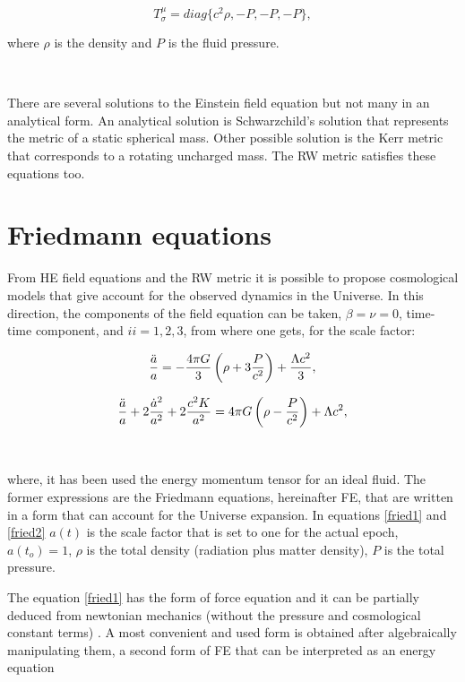 \[T^{\mu}_{\sigma}= diag\{c^2\rho,-P,-P,-P\},\]

where $\rho$ is the density and $P$ is the fluid pressure. 

\

There are several solutions to the Einstein field equation but not
many in an analytical form. An analytical solution is Schwarzchild's solution that 
represents the metric of a static spherical mass. Other possible solution is the Kerr 
metric that corresponds to a rotating uncharged mass. The RW  metric satisfies these equations too. 
	

\section{ Friedmann equations }


From HE field equations and the RW metric it is possible to propose 
cosmological models that give account for the observed dynamics
in the Universe. In this direction, the components of the 
field equation can be taken, $\beta=\nu= 0$, time-time component,
and $ii=1,2,3$, from where one gets, for the scale factor:

\begin{equation}
\frac{\ddot{a}}{a} = -\frac{4\pi G}{3 }\left( \rho + 3 \frac{P}{c^2} \right)+\frac{\Lambda c^2}{3},
\label{fried1}
\end{equation}

\begin{equation}
\frac{\ddot{a}}{a}+2\frac{\dot{a}^2}{a^2}+2\frac{c^2 K}{a^2} = 4\pi G\left( \rho-\frac{P}{c^2}\right)+\Lambda c^2,
\label{fried2}
\end{equation}

\

where, it has been used the energy momentum tensor for an ideal fluid. 
The former expressions are the Friedmann equations, hereinafter FE, that are written in a form
that can account for the Universe expansion. In equations \ref{fried1} and \ref{fried2}
$a(t)$ is the scale factor that is set to one for the actual epoch,
$a(t_o)=1$, $\rho$ is the total density (radiation plus matter density), $P$ is
the total pressure.  

The equation \ref{fried1} has the form of force equation and it can
be partially deduced from newtonian mechanics (without the pressure
and cosmological constant terms) \cite{Longair}. A most convenient and used form
is obtained after algebraically manipulating them, a second form of 
FE that can be interpreted as an energy equation

